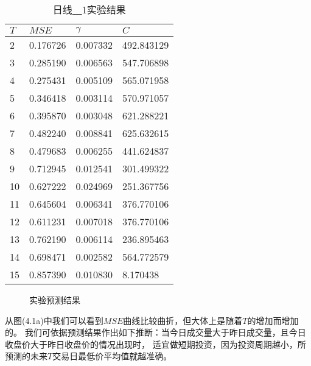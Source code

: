 \begin{table}[ht]
    \centering
    \caption{日线\underline{~~}1实验结果}
    \begin{tabular}{llll}
        \hline
        $T$ &     $MSE$ &  $\gamma$ &         $C$ \\
        \hline
          2 &  0.176726 &  0.007332 &  492.843129 \\
          3 &  0.285190 &  0.006563 &  547.706898 \\
          4 &  0.275431 &  0.005109 &  565.071958 \\
          5 &  0.346418 &  0.003114 &  570.971057 \\
          6 &  0.395870 &  0.003048 &  621.288221 \\
          7 &  0.482240 &  0.008841 &  625.632615 \\
          8 &  0.479683 &  0.006255 &  441.624837 \\
          9 &  0.712945 &  0.012541 &  301.499322 \\
         10 &  0.627222 &  0.024969 &  251.367756 \\
         11 &  0.645604 &  0.006341 &  376.770106 \\
         12 &  0.611231 &  0.007018 &  376.770106 \\
         13 &  0.762190 &  0.006114 &  236.895463 \\
         14 &  0.698471 &  0.002582 &  564.772579 \\
         15 &  0.857390 &  0.010830 &    8.170438 \\
        \hline
    \end{tabular}
\end{table}

\begin{figure}[htbp]
    \centering
    \caption{实验预测结果}
    \quad
    \quad
    \quad
\end{figure}

从图(4.1a)中我们可以看到$MSE$曲线比较曲折，但大体上是随着$T$的增加而增加的。
我们可依据预测结果作出如下推断：当今日成交量大于昨日成交量，且今日收盘价大于昨日收盘价的情况出现时，
适宜做短期投资，因为投资周期越小，所预测的未来$T$交易日最低价平均值就越准确。

